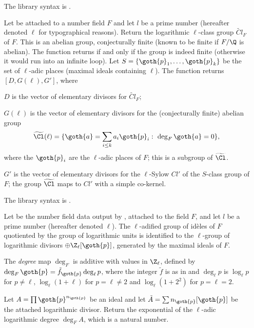 The library syntax is .

\label{se:bnflog}
Let  be attached to a number field $F$ and let $l$ be
a prime number (hereafter denoted $\ell$ for typographical reasons). Return
the logarithmic $\ell$-class group $\widetilde{Cl}_F$
of $F$. This is an abelian group, conjecturally finite (known to be finite
if $F/\Q$ is abelian). The function returns if and only if
the group is indeed finite (otherwise it would run into an infinite loop).
Let $S = \{ \goth{p}_1,\dots, \goth{p}_k\}$ be the set of $\ell$-adic places
(maximal ideals containing $\ell$).
The function returns $[D, G(\ell), G']$, where

\item $D$ is the vector of elementary divisors for $\widetilde{Cl}_F$;

\item $G(\ell)$ is the vector of elementary divisors for
the (conjecturally finite) abelian group
$$\widetilde{\Cl}(\ell) =
\{ \goth{a} = \sum_{i \leq k} a_i \goth{p}_i :~\deg_F \goth{a} = 0\},$$
where the $\goth{p}_i$ are the $\ell$-adic places of $F$; this is a
subgroup of $\widetilde{\Cl}$.

\item $G'$ is the vector of elementary divisors for the $\ell$-Sylow $Cl'$
of the $S$-class group of $F$; the group $\widetilde{\Cl}$ maps to $Cl'$
with a simple co-kernel.

The library syntax is .

\label{se:bnflogdegree}
Let  be the number field data output by ,
attached to the field $F$, and let $l$ be a prime number (hereafter
denoted $\ell$). The
$\ell$-adified group of id\`{e}les of $F$ quotiented by
the group of logarithmic units is identified to the $\ell$-group
of logarithmic divisors $\oplus \Z_\ell [\goth{p}]$, generated by the
maximal ideals of $F$.

The \emph{degree} map $\deg_F$ is additive with values in $\Z_\ell$,
defined by $\deg_F \goth{p} = \tilde{f}_{\goth{p}} \deg_\ell p$,
where the integer $\tilde{f}$ is as in  and $\deg_\ell p$
is $\log_\ell p$ for $p\neq \ell$, $\log_\ell (1 + \ell)$ for
$p = \ell\neq 2$ and $\log_\ell (1 + 2^2)$ for $p = \ell = 2$.

Let $A = \prod \goth{p}^{n_{\goth{p}}}$ be an ideal and let $\tilde{A} =
\sum n_\goth{p} [\goth{p}]$ be the attached logarithmic divisor. Return the
exponential of the $\ell$-adic logarithmic degree $\deg_F A$, which is a
natural number.


